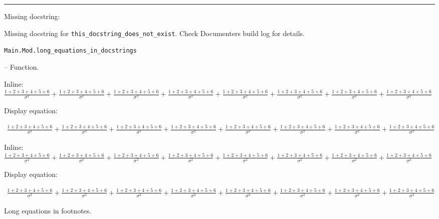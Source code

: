 {\rule{\textwidth}{1pt}}


Missing docstring:



\begin{tcolorbox}[toptitle=-1mm,bottomtitle=1mm,colback=admonition-warning!50!white,colframe=admonition-warning,title=\textbf{Missing docstring.}]
Missing docstring for \texttt{this\_docstring\_does\_not\_exist}. Check Documenter{\textquotesingle}s build log for details.

\end{tcolorbox}

\hypertarget{15818938160560313688}{\texttt{Main.Mod.long\_equations\_in\_docstrings}}  -- {Function.}

\begin{adjustwidth}{2em}{0pt}

Inline: \(\frac{1+2+3+4+5+6}{\sigma^2} + \frac{1+2+3+4+5+6}{\sigma^2} + \frac{1+2+3+4+5+6}{\sigma^2} + \frac{1+2+3+4+5+6}{\sigma^2} + \frac{1+2+3+4+5+6}{\sigma^2} + \frac{1+2+3+4+5+6}{\sigma^2} + \frac{1+2+3+4+5+6}{\sigma^2} + \frac{1+2+3+4+5+6}{\sigma^2}\)

Display equation:

\begin{equation*}
\begin{split}\frac{1+2+3+4+5+6}{\sigma^2} + \frac{1+2+3+4+5+6}{\sigma^2} + \frac{1+2+3+4+5+6}{\sigma^2} + \frac{1+2+3+4+5+6}{\sigma^2} + \frac{1+2+3+4+5+6}{\sigma^2} + \frac{1+2+3+4+5+6}{\sigma^2} + \frac{1+2+3+4+5+6}{\sigma^2} + \frac{1+2+3+4+5+6}{\sigma^2}\end{split}\end{equation*}
\begin{tcolorbox}[toptitle=-1mm,bottomtitle=1mm,colback=admonition-note!50!white,colframe=admonition-note,title=\textbf{Long equations in admonitions}]
Inline: \(\frac{1+2+3+4+5+6}{\sigma^2} + \frac{1+2+3+4+5+6}{\sigma^2} + \frac{1+2+3+4+5+6}{\sigma^2} + \frac{1+2+3+4+5+6}{\sigma^2} + \frac{1+2+3+4+5+6}{\sigma^2} + \frac{1+2+3+4+5+6}{\sigma^2} + \frac{1+2+3+4+5+6}{\sigma^2} + \frac{1+2+3+4+5+6}{\sigma^2}\)

Display equation:

\begin{equation*}
\begin{split}\frac{1+2+3+4+5+6}{\sigma^2} + \frac{1+2+3+4+5+6}{\sigma^2} + \frac{1+2+3+4+5+6}{\sigma^2} + \frac{1+2+3+4+5+6}{\sigma^2} + \frac{1+2+3+4+5+6}{\sigma^2} + \frac{1+2+3+4+5+6}{\sigma^2} + \frac{1+2+3+4+5+6}{\sigma^2} + \frac{1+2+3+4+5+6}{\sigma^2}\end{split}\end{equation*}
\end{tcolorbox}
Long equations in footnotes.\footnotemark[1]


\end{adjustwidth}
